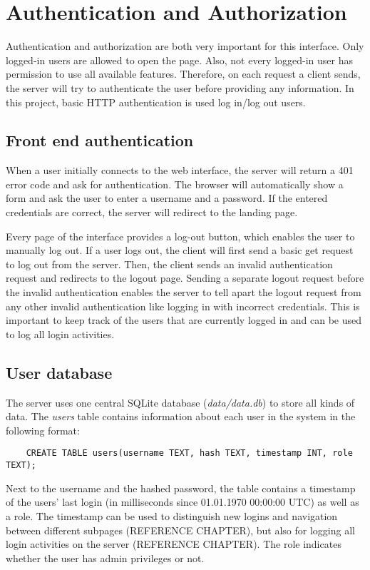 \chapter{Authentication and Authorization}
Authentication and authorization are both very important for this interface. Only logged-in users are allowed to open the page. Also, not every logged-in user has permission to use all available features. Therefore, on each request a client sends, the server will try to authenticate the user before providing any information. In this project, basic HTTP authentication is used log in/log out users.\\

\section{Front end authentication}
When a user initially connects to the web interface, the server will return a 401 error code and ask for authentication. The browser will automatically show a form and ask the user to enter a username and a password. If the entered credentials are correct, the server will redirect to the landing page.

Every page of the interface provides a log-out button, which enables the user to manually log out. 
If a user logs out, the client will first send a basic get request to log out from the server. Then, the client sends an invalid authentication request and redirects to the logout page.
Sending a separate logout request before the invalid authentication enables the server to tell apart the logout request from any other invalid authentication like logging in with incorrect credentials. This is important to keep track of the users that are currently logged in and can be used to log all login activities.


\section{User database}
The server uses one central SQLite database (\textit{data/data.db}) to store all kinds of data. The \textit{users} table contains information about each user in the system in the following format:

\begin{verbatim}
	CREATE TABLE users(username TEXT, hash TEXT, timestamp INT, role TEXT);
\end{verbatim}

Next to the username and the hashed password, the table contains a timestamp of the users' last login (in milliseconds since 01.01.1970 00:00:00 UTC) as well as a role. The timestamp can be used to distinguish new logins and navigation between different subpages (REFERENCE CHAPTER), but also for logging all login activities on the server (REFERENCE CHAPTER). The role indicates whether the user has admin privileges or not.


